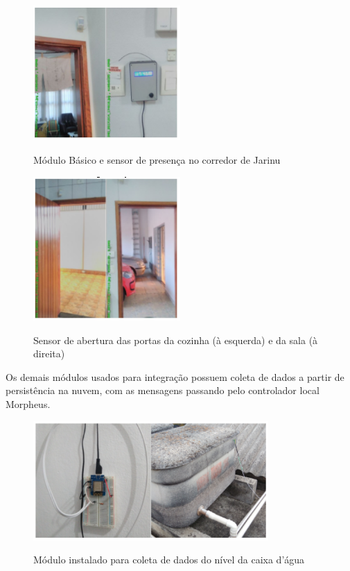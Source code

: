 \begin{figure}[H]
	\centering
	\caption{Módulo Básico e sensor de presença no corredor de Jarinu}
	\includegraphics[width=0.5\textwidth]{BasicSensorPresJarinu}
	\label{fig:BasicSensorPresJarinu}
\end{figure}

\begin{figure}[H]
	\centering
	\caption{Sensor de abertura das portas da cozinha (à esquerda) e da sala (à direita)}
	\includegraphics[width=0.5\textwidth]{SensorPortasJarinu}
	\label{fig:SensorPortasJarinu}
\end{figure}

Os demais módulos usados para integração possuem coleta de dados a partir de persistência na nuvem, com as mensagens passando pelo controlador local Morpheus.

\begin{figure}[H]
	\centering
	\caption{Módulo instalado para coleta de dados do nível da caixa d’água}
	\includegraphics[width=0.8\textwidth]{ModuloCxAgua}
	\label{fig:ModuloCxAgua}
\end{figure}

